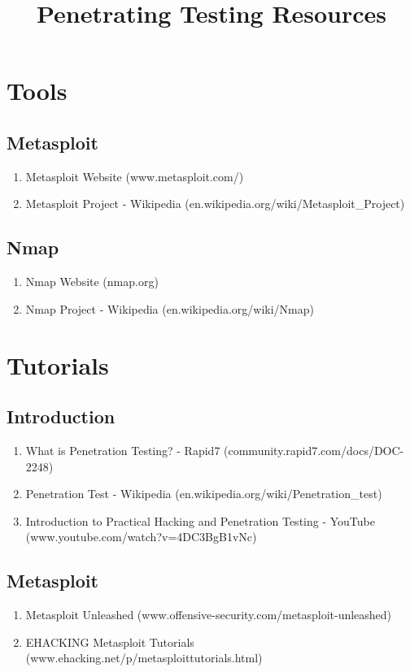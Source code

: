 \documentclass[a4paper]{article}
\title{Penetrating Testing Resources}
\date{}
\begin{document}
\maketitle


\section{Tools}

\subsection{Metasploit}
\begin{enumerate}
	\item Metasploit Website (www.metasploit.com/)
	\item Metasploit Project - Wikipedia (en.wikipedia.org/wiki/Metasploit\_Project)
\end{enumerate}

\subsection{Nmap}
\begin{enumerate}
	\item Nmap Website (nmap.org)
	\item Nmap Project - Wikipedia (en.wikipedia.org/wiki/Nmap)
\end{enumerate}


\section{Tutorials}

\subsection{Introduction}
\begin{enumerate}
	\item What is Penetration Testing? - Rapid7 (community.rapid7.com/docs/DOC-2248)
	\item Penetration Test - Wikipedia (en.wikipedia.org/wiki/Penetration\_test)
    \item Introduction to Practical Hacking and Penetration Testing - YouTube \\(www.youtube.com/watch?v=4DC3BgB1vNc)
\end{enumerate}

\subsection{Metasploit}
\begin{enumerate}
	\item Metasploit Unleashed (www.offensive-security.com/metasploit-unleashed)
	\item EHACKING Metasploit Tutorials (www.ehacking.net/p/metasploittutorials.html)
\end{enumerate}
	
\end{document}
